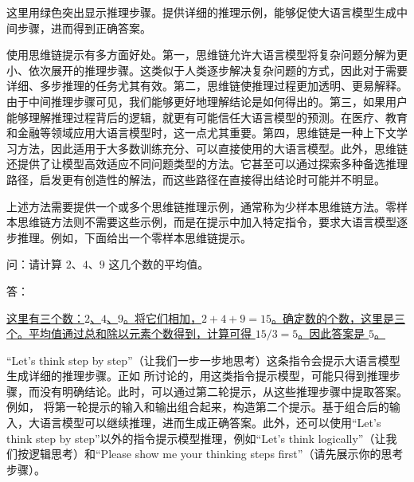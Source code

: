 \noindent 这里用绿色突出显示推理步骤。提供详细的推理示例，能够促使大语言模型生成中间步骤，进而得到正确答案。

使用思维链提示有多方面好处。第一，思维链允许大语言模型将复杂问题分解为更小、依次展开的推理步骤。这类似于人类逐步解决复杂问题的方式，因此对于需要详细、多步推理的任务尤其有效。第二，思维链使推理过程更加透明、更易解释。由于中间推理步骤可见，我们能够更好地理解结论是如何得出的。第三，如果用户能够理解推理过程背后的逻辑，就更有可能信任大语言模型的预测。在医疗、教育和金融等领域应用大语言模型时，这一点尤其重要。第四，思维链是一种上下文学习方法，因此适用于大多数训练充分、可以直接使用的大语言模型。此外，思维链还提供了让模型高效适应不同问题类型的方法。它甚至可以通过探索多种备选推理路径，启发更有创造性的解法，而这些路径在直接得出结论时可能并不明显。

上述方法需要提供一个或多个思维链推理示例，通常称为少样本思维链方法。零样本思维链方法则不需要这些示例，而是在提示中加入特定指令，要求大语言模型逐步推理。例如，下面给出一个零样本思维链提示。

\vspace{0.5em}
\begin{tcolorbox}

\begingroup
\setlength{\leftskip}{2em}
\setlength{\rightskip}{2em}

问：请计算 $2$、$4$、$9$ 这几个数的平均值。

\vspace{0.3em}

答：

\vspace{0.3em}

\uline{这里有三个数：$2$、$4$、$9$。将它们相加，$2+4+9=15$。确定数的个数，这里是三个。平均值通过总和除以元素个数得到，计算可得 $15/3 = 5$。因此答案是 $5$。}

\endgroup

\end{tcolorbox}
\vspace{0.5em}

“Let's think step by step”（让我们一步一步地思考）这条指令会提示大语言模型生成详细的推理步骤。正如 \citet{kojima-etal:2022large} 所讨论的，用这类指令提示模型，可能只得到推理步骤，而没有明确结论。此时，可以通过第二轮提示，从这些推理步骤中提取答案。例如，\citet{kojima-etal:2022large} 将第一轮提示的输入和输出组合起来，构造第二个提示。基于组合后的输入，大语言模型可以继续推理，进而生成正确答案。此外，还可以使用“Let's think step by step”以外的指令提示模型推理，例如“Let's think logically”（让我们按逻辑思考）和“Please show me your thinking steps first”（请先展示你的思考步骤）。

